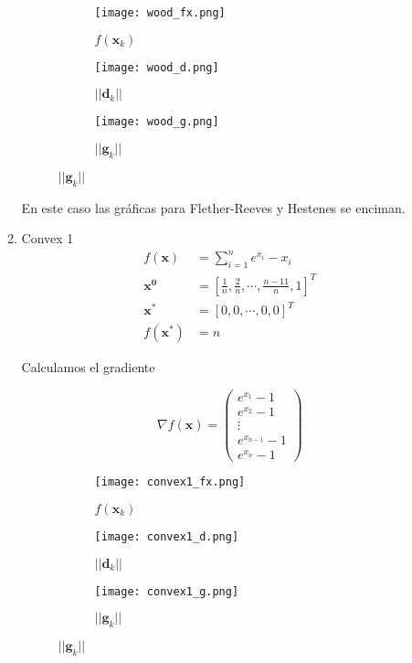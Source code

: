 \documentclass{article}
\begin{document}
\begin{enumerate}
\begin{enumerate}
  \begin{figure}[ht]
    \centering
    \begin{subfigure}[b]{0.3\linewidth}
        \centering
        \texttt{[image: wood\_fx.png]}
        \caption{$f(\boldsymbol{x}_k)$}
        \label{wood_f}
    \end{subfigure}
    \begin{subfigure}[b]{0.3\linewidth}
        \centering
        \texttt{[image: wood\_d.png]}
        \caption{$||\boldsymbol{d}_k||$}
        \label{wood_d}
    \end{subfigure}
    \begin{subfigure}[b]{0.3\linewidth}
        \centering
        \texttt{[image: wood\_g.png]}
        \caption{$||\boldsymbol{g}_k||$}
        \label{wood_g}
    \end{subfigure}
  \end{figure}

En este caso las gráficas para Flether-Reeves y Hestenes se enciman.

\newpage
  \item Convex 1
  \begin{align*} 
  f(\boldsymbol{x}) &= \sum_{i = 1}^{n} e^{x_i} - x_i\\
  \boldsymbol{x^0} &= [\frac{1}{n}, \frac{2}{n}, \cdots, \frac{n-11}{n}, 1]^T \\
  \boldsymbol{x^*} &= [0,0,\cdots, 0, 0]^T \\
  f(\boldsymbol{x^*}) &= n
  \end{align*}

  Calculamos el gradiente

  $$\nabla f(\boldsymbol{x}) = 
   \begin{pmatrix}
     e^{x_1} - 1 \\
     e^{x_2} - 1\\
     \vdots\\
     e^{x_{n-1}} - 1\\
     e^{x_n} - 1
   \end{pmatrix}$$



  \begin{figure}[ht]
    \centering
    \begin{subfigure}[b]{0.3\linewidth}
        \centering
        \texttt{[image: convex1\_fx.png]}
        \caption{$f(\boldsymbol{x}_k)$}
        \label{convex1_f}
    \end{subfigure}
    \begin{subfigure}[b]{0.3\linewidth}
        \centering
        \texttt{[image: convex1\_d.png]}
        \caption{$||\boldsymbol{d}_k||$}
        \label{convex1_d}
    \end{subfigure}
    \begin{subfigure}[b]{0.3\linewidth}
        \centering
        \texttt{[image: convex1\_g.png]}
        \caption{$||\boldsymbol{g}_k||$}
        \label{convex1_g}
    \end{subfigure}
  \end{figure}


\end{enumerate}
\end{enumerate}
\end{document}
